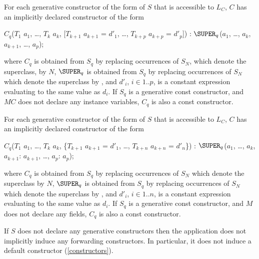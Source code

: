 \documentclass[makeidx]{article}
\begin{document}
\LMHash{}%
For each generative constructor of the form
of $S$ that is accessible to $L_C$, $C$ has
an implicitly declared constructor of the form

\begin{normativeDartCode}
$C_q$($T_{1}$ $a_{1}$, \ldots , $T_{k}$ $a_{k}$, [$T_{k+1}$ $a_{k+1}$ = $d'_{1}$, \ldots , $T_{k+p}$ $a_{k+p}$ = $d'_p$])
    : $\SUPER_q$($a_{1}$, \ldots , $a_{k}$, $a_{k+1}$, \ldots, $a_p$);
\end{normativeDartCode}

\noindent
where $C_q$ is obtained from $S_q$ by replacing occurrences of $S_N$,
which denote the superclass, by $N$,
$\SUPER_q$ is obtained from $S_q$ by replacing occurrences of $S_N$
which denote the superclass by \SUPER,
and $d'_i$, $i \in 1..p$, is a constant expression evaluating
to the same value as $d_i$.
If $S_q$ is a generative const constructor, and $MC$ does not declare any
instance variables, $C_q$ is also a const constructor.

\LMHash{}%
For each generative constructor of the form
of $S$ that is accessible to $L_C$, $C$ has
an implicitly declared constructor of the form

\begin{normativeDartCode}
$C_q$($T_{1}$ $a_{1}$, \ldots , $T_{k}$ $a_{k}$, \{$T_{k+1}$ $a_{k+1}$ = $d'_1$, \ldots , $T_{k+n}$ $a_{k+n}$ = $d'_n$\})
    : $\SUPER_q$($a_{1}$, \ldots , $a_{k}$, $a_{k+1}$: $a_{k+1}$, \ldots, $a_p$: $a_p$);
\end{normativeDartCode}

\noindent
where $C_q$ is obtained from $S_q$ by replacing occurrences of $S_N$
which denote the superclass by $N$,
$\SUPER_q$ is obtained from $S_q$ by replacing occurrences of $S_N$
which denote the superclass by \SUPER,
and $d'_i$, $i \in 1..n$, is a constant expression evaluating to
the same value as $d_i$.
If $S_q$ is a generative const constructor, and $M$ does not declare any
fields, $C_q$ is also a const constructor.

\LMHash{}%
If $S$ does not declare any generative constructors then the application
does not implicitly induce any forwarding constructors.
In particular, it does not induce a default constructor
(\ref{constructors}).

\end{document}
